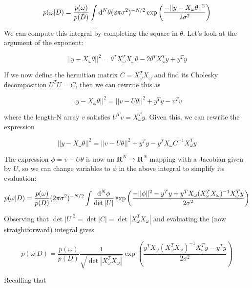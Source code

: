 \documentclass[12pt,pdftex]{article}
\begin{document}
\begin{equation}
  p(\omega|D) = \frac{p(\omega)}{p(D)}\int{\rm d}^N\theta(2\pi\sigma^2)^{-N/2}\exp\left(\frac{-||y - X_\omega\theta||^2}{2\sigma^2}\right)
\end{equation}

We can compute this integral by completing the square in $\theta$. Let's look at the argument of the exponent:

\begin{equation}
  ||y - X_\omega\theta||^2 = \theta^TX_\omega^TX_\omega\theta - 2\theta^TX_\omega^Ty + y^Ty
\end{equation}

If we now define the hermitian matrix $C = X_\omega^TX_\omega$ and find its Cholesky decomposition $U^TU = C$, then we can rewrite this as

\begin{equation}
  ||y - X_\omega\theta||^2 = ||v - U\theta||^2 + y^Ty - v^Tv
\end{equation}

where the length-N array $v$ satisfies $U^Tv = X_\omega^Ty$. Given this, we can rewrite the expression

\begin{equation}
  ||y - X_\omega\theta||^2 = ||v - U\theta||^2 + y^Ty - y^TX_\omega C^{-1}X_\omega^Ty
\end{equation}

The expression $\phi = v - U\theta$ is now an $\mathbf{R}^N\to\mathbf{R}^N$ mapping with a Jacobian given by $U$, so we can change variables to $\phi$ in the above integral to simplify its evaluation:

\begin{equation}
  p(\omega|D) = \frac{p(\omega)}{p(D)}(2\pi\sigma^2)^{-N/2}
\int\frac{{\rm d}^N\phi}{\det|U|}\exp\left(\frac{-||\phi||^2 - y^Ty + y^TX_\omega(X_\omega^TX_\omega)^{-1}X_\omega^Ty}{2\sigma^2}\right)
\end{equation}

Observing that $\det|U|^2 = \det|C| = \det|X_\omega^TX_\omega|$ and evaluating the (now straightforward) integral gives

\begin{equation}
  p(\omega|D) = \frac{p(\omega)}{p(D)}\frac{1}{\sqrt{\det|X_\omega^TX_\omega|}}
  \exp\left(\frac{y^TX_\omega(X_\omega^TX_\omega)^{-1}X_\omega^Ty - y^Ty}{2\sigma^2}\right)
\end{equation}

Recalling that
\end{document}
